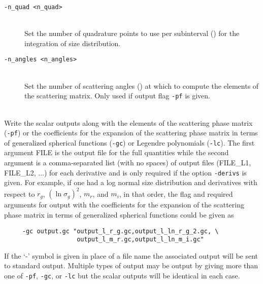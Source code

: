 \begin{description}
\item[\texttt{-n\_quad <n\_quad>}] \hfill \\
Set the number of quadrature points to use per subinterval () for the integration of size distribution.

\item[\texttt{-n\_angles <n\_angles>}] \hfill \\
Set the number of scattering angles () at which to compute the elements of the scattering matrix.  Only used if output flag \texttt{-pf} is given.

\end{description}


\label{lmie_command_line_program_calllmie_calllmie_input_format_output_flags}

\begin{description}

\item[\texttt{-pf,-gc,-lc <FILE> [FILE\_L1,FILE\_L2,...]}] \hfill \\
Write the scalar outputs along with the elements of the scattering phase matrix (\texttt{-pf}) or the coefficients for the expansion of the scattering phase matrix in terms of generalized spherical functions (\texttt{-gc}) or Legendre polynomials (\texttt{-lc}).  The first argument FILE is the output file for the full quantities while the second argument is a comma-separated list (with no spaces) of output files (FILE\_L1, FILE\_L2, ...) for each derivative and is only required if the option \texttt{-derivs} is given.  For example, if one had a log normal size distribution and derivatives with respect to $r_{g}$, $(\ln \sigma_{g})^{2}$, $m_{r}$, and $m_{i}$, in that order, the flag and required arguments for output with the coefficients for the expansion of the scattering phase matrix in terms of generalized spherical functions could be given as
\begin{verbatim}
     -gc output.gc "output_l_r_g.gc,output_l_ln_r_g_2.gc, \
                    output_l_m_r.gc,output_l_ln_m_i.gc"
\end{verbatim}
If the `-' symbol is given in place of a file name the associated output will be sent to standard output.  Multiple types of output may be output by giving more than one of \texttt{-pf}, \texttt{-gc}, or \texttt{-lc} but the scalar outputs will be identical in each case.

\end{description}


